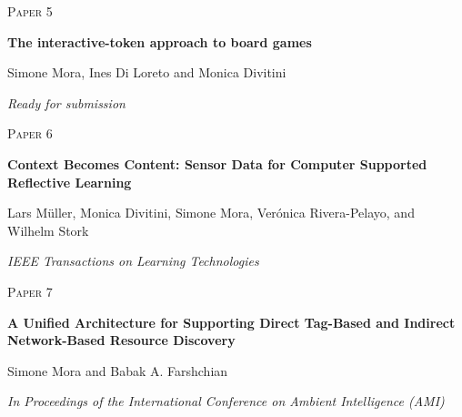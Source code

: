 \cleardoublepage
\begin{flushright}
\textsc{\huge Paper 5}
\end{flushright}
\vspace{3cm}
\begin{center}
	\begin{framed}
		{\Large \textbf{The interactive-token approach to board games}}	
		\medskip
		
		Simone Mora, Ines Di Loreto and Monica Divitini
		
		\medskip		
		\emph{Ready for submission}
	\end{framed}	
\end{center}
\cleardoublepage


\cleardoublepage
\begin{flushright}
\textsc{\huge Paper 6}
\end{flushright}
\vspace{3cm}
\begin{center}
	\begin{framed}
		{\Large \textbf{Context Becomes Content: Sensor Data for Computer Supported Reflective Learning}}	
		\medskip
		
		Lars Müller, Monica Divitini, Simone Mora, Verónica Rivera-Pelayo, and Wilhelm Stork	
		
		\medskip		
		\emph{IEEE Transactions on Learning Technologies}
	\end{framed}	
\end{center}
\cleardoublepage


\cleardoublepage
\begin{flushright}
\textsc{\huge Paper 7}
\end{flushright}
\vspace{3cm}
\begin{center}
	\begin{framed}
		{\Large \textbf{A Unified Architecture for Supporting Direct Tag-Based and Indirect Network-Based Resource Discovery}}	
		\medskip
		
		Simone Mora and Babak A. Farshchian
		
		\medskip		
		\emph{In Proceedings of the International Conference on Ambient Intelligence (AMI)}
	\end{framed}	
\end{center}
\cleardoublepage

